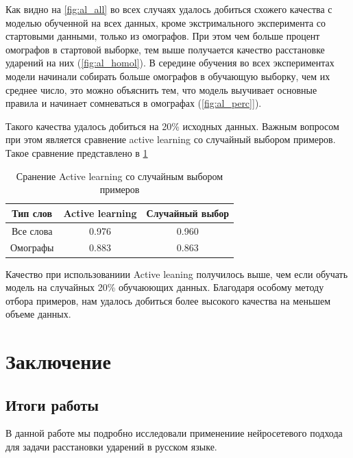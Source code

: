 \documentclass[14pt, a4paper, russian]{extreport}
\begin{document}
Как видно на \cref{fig:al_all} во всех случаях удалось добиться схожего качества с моделью обученной на всех данных, кроме экстримального эксперимента со стартовыми данными, только из омографов. При этом чем больше процент омографов в стартовой выборке, тем выше получается качество расстановке ударений на них (\cref{fig:al_homol}). В середине обучения во всех экспериментах модели начинали собирать больше омографов в обучающую выборку, чем их среднее число, это можно объяснить тем, что модель выучивает основные правила и начинает сомневаться в омографах (\cref{fig:al_perc}]).
 
 Такого качества удалось добиться на 20\% исходных данных. Важным вопросом при этом является сравнение active learning со случайный выбором примеров.  Такое сравнение представлено в \cref{table:al}

\begin{table}[H]
	\caption{Сранение Active learning со случайным выбором примеров}
	
	\begin{small}
		\begin{center}
			\begin{tabular}{|c | c | c |}
				\hline
				Тип слов  &  Active learning & Случайный выбор \\ \hline
				Все слова & 0.976          & 0.960            \\ \hline
				Омографы  & 0.883          & 0.863      \\ \hline
			\end{tabular}
		\end{center}
	\end{small}
	\label{table:al}
\end{table}

Качество при использованиии Active leaning получилось выше, чем если обучать модель на случайных 20\% обучаюющих данных. Благодаря особому методу отбора примеров, нам удалось добиться более высокого качества на меньшем объеме данных. 



\newpage
\chapter*{Заключение}
\section*{Итоги работы}
В данной работе мы подробно исследовали применениие нейросетевого подхода для задачи расстановки ударений в русском языке. 
\end{document}
